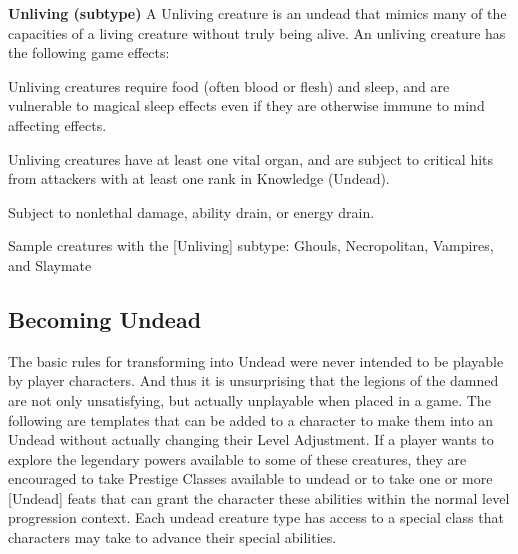 \textbf{Unliving (subtype)}
A Unliving creature is an undead that mimics many of the capacities of a living creature without truly being alive. An unliving creature has the following game effects:
\begin{itemize*}
\item Unliving creatures require food (often blood or flesh) and sleep, and are vulnerable to magical sleep effects even if they are otherwise immune to mind affecting effects.
\item Unliving creatures have at least one vital organ, and are subject to critical hits from attackers with at least one rank in Knowledge (Undead).
\item Subject to nonlethal damage, ability drain, or energy drain.
\item Sample creatures with the [Unliving] subtype: Ghouls, Necropolitan, Vampires, and Slaymate
\end{itemize*}

\subsection{Becoming Undead}
The basic rules for transforming into Undead were never intended to be playable by player characters. And thus it is unsurprising that the legions of the damned are not only unsatisfying, but actually unplayable when placed in a game. The following are templates that can be added to a character to make them into an Undead without actually changing their Level Adjustment. If a player wants to explore the legendary powers available to some of these creatures, they are encouraged to take Prestige Classes available to undead or to take one or more [Undead] feats that can grant the character these abilities within the normal level progression context. Each undead creature type has access to a special class that characters may take to advance their special abilities.

